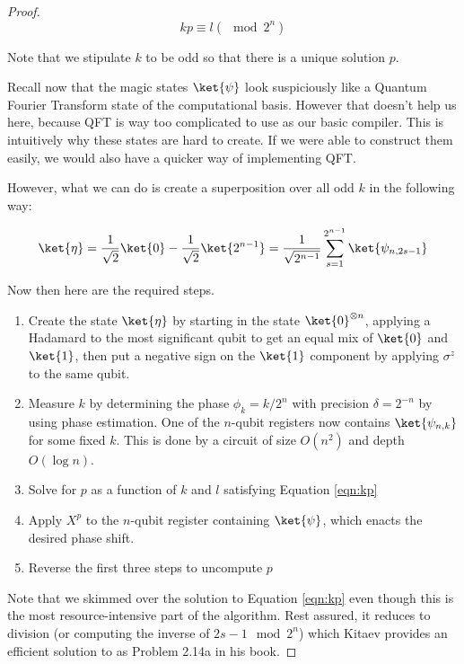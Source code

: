 \documentclass{article}
\theoremstyle{plain}
\begin{document}
\begin{proof}
\begin{equation}
\label{eqn:kp}
kp \equiv l (\mod 2^n)
\end{equation}

Note that we stipulate $k$ to be odd so that there is a unique solution $p$.

Recall now that the magic states $\ket{\psi}$ look suspiciously like a
Quantum Fourier Transform state of the computational basis.
However that doesn't help us here, because QFT is way too complicated to use as
our basic compiler. This is intuitively why these states are hard to create.
If we were able to construct them easily, we would also have a quicker way
of implementing QFT.

However, what we can do is create a superposition over all odd $k$ in the
following way:

\begin{equation}
\ket{\eta} = \normtwo \ket{0} - \normtwo \ket{2^{n-1}} =
\frac{1}{\sqrt{2^{n-1}}} \sum_{s=1}^{2^{n-1}} \ket{\psi_{n,2s-1}}
\end{equation}

Now then here are the required steps.

\begin{enumerate}
\item Create the state $\ket{\eta}$ by starting in the state $\ket{0}^{\otimes n}$,
applying a Hadamard to the most significant qubit to get an equal mix of $\ket{0}$
and $\ket{1}$, then put a negative sign on the $\ket{1}$ component by applying
$\sigma^z$ to the same qubit.
\item Measure $k$ by determining the phase $\phi_k = k/2^n$ with precision
$\delta = 2^{-n}$ by using phase estimation. One of the $n$-qubit registers
now contains $\ket{\psi_{n,k}}$ for some fixed $k$.
This is done by a circuit of size $O(n^2)$ and depth $O(\log n)$.
\item Solve for $p$ as a function of $k$ and $l$ satisfying Equation \ref{eqn:kp}
\item Apply $X^p$ to the $n$-qubit register containing $\ket{\psi}$, which
enacts the desired phase shift.
\item Reverse the first three steps to uncompute $p$
\end{enumerate}

Note that we skimmed over the solution to Equation \ref{eqn:kp} even though this
is the most resource-intensive part of the algorithm. Rest assured, it reduces
to division (or computing the inverse of $2s-1 \mod 2^n$) which Kitaev
provides an efficient solution to as Problem 2.14a in his book.

\end{proof}
\end{document}
